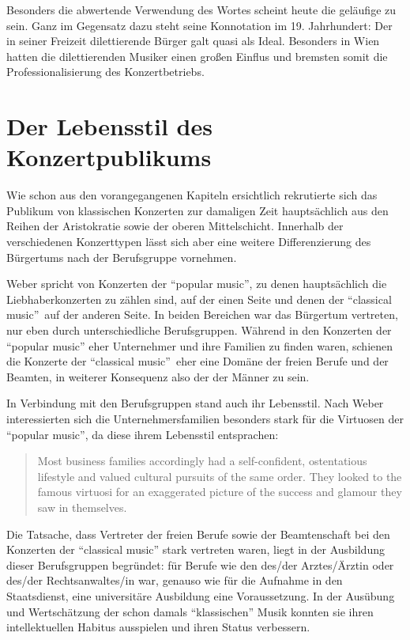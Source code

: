 \documentclass[a4paper, german, oneside]{scrbook}
\begin{document}
Besonders die abwertende Verwendung des Wortes scheint heute die geläufige zu sein. Ganz im Gegensatz dazu steht seine Konnotation im 19. Jahrhundert: Der in seiner Freizeit dilettierende Bürger galt quasi als Ideal. Besonders in Wien hatten die dilettierenden Musiker einen großen Einflus und bremsten somit die Professionalisierung des Konzertbetriebs. \parencite[vgl.][88]{weber_music_2004}



\section{Der Lebensstil des Konzertpublikums} %
\label{lebensstil}
Wie schon aus den vorangegangenen Kapiteln ersichtlich rekrutierte sich das Publikum von klassischen Konzerten zur damaligen Zeit hauptsächlich aus den Reihen der Aristokratie sowie der oberen Mittelschicht. Innerhalb der verschiedenen Konzerttypen lässt sich aber eine weitere Differenzierung des Bürgertums nach der Berufsgruppe vornehmen.

Weber spricht von Konzerten der \enquote{popular music}, zu denen hauptsächlich die Liebhaberkonzerten zu zählen sind, auf der einen Seite und denen der \enquote{classical music} auf der anderen Seite. In beiden Bereichen war das Bürgertum vertreten, nur eben durch unterschiedliche Berufsgruppen. Während in den Konzerten der \enquote{popular music} eher Unternehmer und ihre Familien zu finden waren, schienen die Konzerte der \enquote{classical music} eher eine Domäne der freien Berufe und der Beamten, in weiterer Konsequenz also der der Männer zu sein. \parencite[vgl.][S. 63 und 66]{weber_music_2004}

In Verbindung mit den Berufsgruppen stand auch ihr Lebensstil. Nach Weber interessierten sich die Unternehmersfamilien besonders stark für die Virtuosen der \enquote{popular music}, da diese ihrem Lebensstil entsprachen: \blockquote[{\cite[39]{weber_music_2004}}]{Most business families accordingly had a self-confident, ostentatious lifestyle and valued cultural pursuits of the same order. They looked to the famous virtuosi for an exaggerated picture of the success and glamour they saw in themselves.}

Die Tatsache, dass Vertreter der freien Berufe sowie der Beamtenschaft bei den Konzerten der \enquote{classical music} stark vertreten waren, liegt in der Ausbildung dieser Berufsgruppen begründet: für Berufe wie den des/der Arztes/Ärztin oder des/der Rechtsanwaltes/in war, genauso wie für die Aufnahme in den Staatsdienst, eine universitäre Ausbildung eine Voraussetzung. In der Ausübung und Wertschätzung der schon damals \enquote{klassischen} Musik konnten sie ihren intellektuellen Habitus ausspielen und ihren Status verbessern. \parencite[vgl.][67]{weber_music_2004}
\end{document}
